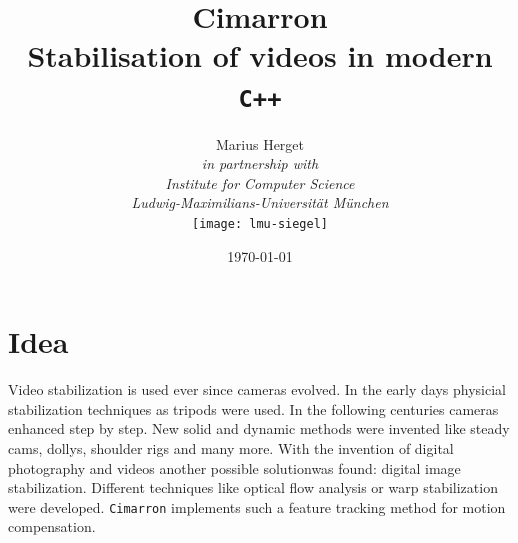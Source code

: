 \newcommand{\pdftitel}{Cimarron Herget 2017}
\newcommand{\autor}{Marius Herget}
\newcommand{\version}{draft} %
\newcommand{\isPrintVersion}{true}




\newcommand{\tbd}[1][null]{
    \ifthenelse{\equal{#1}{null}}
    {\ignorespaces\textit{\impmark\color{orange}\textbf{TBD}}}
    {\ignorespaces\textit{\impmark\color{orange}[TBD: #1]}}
}
\newcommand{\todo}[1][null]{
    \ifthenelse{\equal{#1}{null}}
    {\ignorespaces\textit{\impmark\color{orange}\textbf{TBD}}}
    {\ignorespaces\textit{\impmark\color{orange}[TBD: #1]}}
}



{}
\title{\textbf{Cimarron}\\Stabilisation of videos in modern \texttt{C++}}
\date{\today}
\author{    Marius Herget\\[2em]
            \textit{in partnership with}\\[2em]
            \textit{Institute for Computer Science}\\
            \textit{Ludwig-Maximilians-Universit\"at M\"unchen}\\[3em]
            \texttt{[image: lmu-siegel]}}
\maketitle
\newpage
{}

\section{Idea}
Video stabilization is used ever since cameras evolved. In the early days physicial stabilization techniques as tripods were used. In the following centuries cameras enhanced step by step. New solid and dynamic methods were invented like steady cams, dollys, shoulder rigs and many more. With the invention of digital photography and videos another possible solutionwas found: digital image stabilization. Different techniques like optical flow analysis or warp stabilization were developed. \texttt{Cimarron} implements such a feature tracking method for motion compensation.

